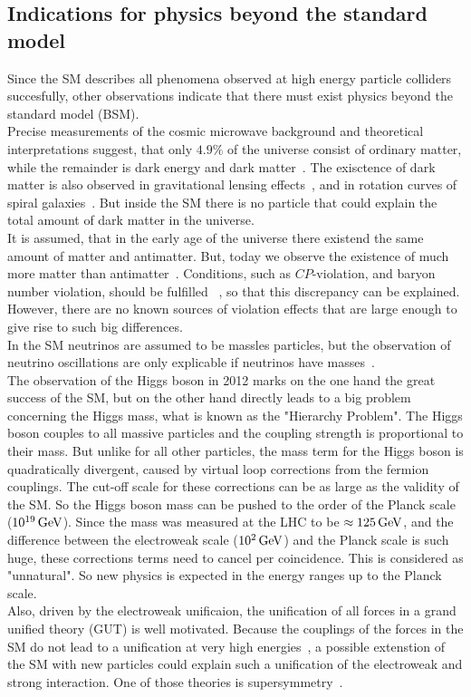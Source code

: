 \subsection{Indications for physics beyond the standard model}\label{sec:SM_bsm}
Since the SM describes all phenomena observed at high energy particle colliders succesfully, other observations indicate that there must exist physics beyond the standard model (BSM).\\
Precise measurements of the cosmic microwave background and theoretical interpretations suggest, that only $4.9\%$ of the universe consist of ordinary matter, while the remainder is dark energy and dark matter~\cite{DarkMatterPlanck}. The exisctence of dark matter is also observed in gravitational lensing effects~\cite{DarkMatterLensing}, and in rotation curves of spiral galaxies~\cite{DarkMatterRotation}. But inside the SM there is no particle that could explain the total amount of dark matter in the universe.\\
It is assumed, that in the early age of the universe there existend the same amount of matter and antimatter. But, today we observe the existence of much more matter than antimatter~\cite{Antimatter,AsymSM}. Conditions, such as $CP$-violation, and baryon number violation, should be fulfilled ~\cite{Sakharov}, so that this discrepancy can be explained. However, there are no known sources of violation effects that are large enough to give rise to such big differences.\\
In the SM neutrinos are assumed to be massles particles, but the observation of neutrino oscillations are only explicable if neutrinos have masses~\cite{NeutrinoMass,PDG}.\\
The observation of the Higgs boson in 2012 marks on the one hand the great success of the SM, but on the other hand directly leads to a big problem concerning the Higgs mass, what is known as the "Hierarchy Problem". The Higgs boson couples to all massive particles and the coupling strength is proportional to their mass. But unlike for all other particles, the mass term for the Higgs boson is quadratically divergent, caused by virtual loop corrections from the fermion couplings. The cut-off scale for these corrections can be as large as the validity of the SM. So the Higgs boson mass can be pushed to the order of the Planck scale ($10^{19}\,\text{Ge\hspace{-.08em}V}$). Since the mass was measured at the LHC to be $\approx 125\,\text{Ge\hspace{-.08em}V}$, and the difference between the electroweak scale ($10^2\,\text{Ge\hspace{-.08em}V}$) and the Planck scale is such huge, these corrections terms need to cancel per coincidence. This is considered as "unnatural". So new physics is expected in the energy ranges up to the Planck scale.\\
Also, driven by the electroweak unificaion, the unification of all forces in a grand unified theory (GUT) is well motivated. Because the couplings of the forces in the SM do not lead to a unification at very high energies~\cite{PDG}, a possible extenstion of the SM with new particles could explain such a unification of the electroweak and strong interaction. One of those theories is supersymmetry~\cite{SUSYOriginal}.


